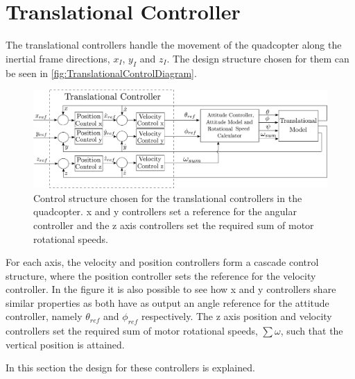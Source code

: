 \section{Translational Controller} \label{sec:TranslationalController}

The translational controllers handle the movement of the quadcopter along the inertial frame directions, $x_I$, $y_I$ and $z_I$. The design structure chosen for them can be seen in \autoref{fig:TranslationalControlDiagram}.
\begin{figure}[H]
	\centering
	\includegraphics[scale=0.25]{figures/TranslationalControlDiagram}
	\caption{Control structure chosen for the translational controllers in the quadcopter. x and y controllers set a reference for the angular controller and the z axis controllers set the required sum of motor rotational speeds.}
	\label{fig:TranslationalControlDiagram}
\end{figure}
For each axis, the velocity and position controllers form a cascade control structure, where the position controller sets the reference for the velocity controller. In the figure it is also possible to see how x and y controllers share similar properties as both have as output an angle reference for the attitude controller, namely $\theta_{ref}$ and $\phi_{ref}$ respectively. 
The z axis position and velocity controllers set the required sum of motor rotational speeds, $\sum\omega$, such that the vertical position is attained.

In this section the design for these controllers is explained.